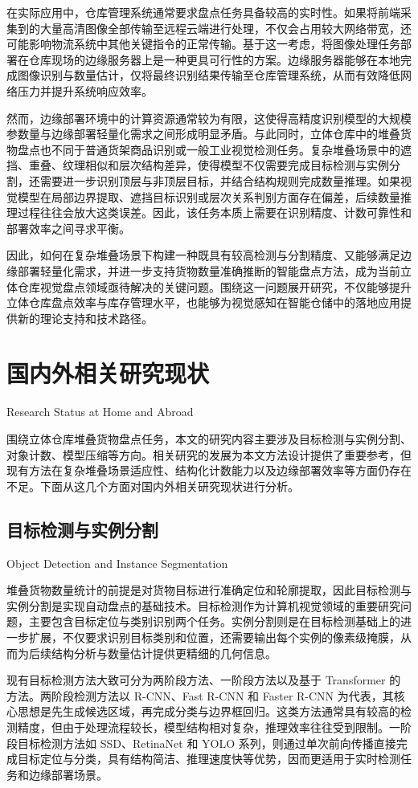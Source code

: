 在实际应用中，仓库管理系统通常要求盘点任务具备较高的实时性。如果将前端采集到的大量高清图像全部传输至远程云端进行处理，不仅会占用较大网络带宽，还可能影响物流系统中其他关键指令的正常传输。基于这一考虑，将图像处理任务部署在仓库现场的边缘服务器上是一种更具可行性的方案。边缘服务器能够在本地完成图像识别与数量估计，仅将最终识别结果传输至仓库管理系统，从而有效降低网络压力并提升系统响应效率。

然而，边缘部署环境中的计算资源通常较为有限，这使得高精度识别模型的大规模参数量与边缘部署轻量化需求之间形成明显矛盾。与此同时，立体仓库中的堆叠货物盘点也不同于普通货架商品识别或一般工业视觉检测任务。复杂堆叠场景中的遮挡、重叠、纹理相似和层次结构差异，使得模型不仅需要完成目标检测与实例分割，还需要进一步识别顶层与非顶层目标，并结合结构规则完成数量推理。如果视觉模型在局部边界提取、遮挡目标识别或层次关系判别方面存在偏差，后续数量推理过程往往会放大这类误差。因此，该任务本质上需要在识别精度、计数可靠性和部署效率之间寻求平衡。

因此，如何在复杂堆叠场景下构建一种既具有较高检测与分割精度、又能够满足边缘部署轻量化需求，并进一步支持货物数量准确推断的智能盘点方法，成为当前立体仓库视觉盘点领域亟待解决的关键问题。围绕这一问题展开研究，不仅能够提升立体仓库盘点效率与库存管理水平，也能够为视觉感知在智能仓储中的落地应用提供新的理论支持和技术路径。

\section{国内外相关研究现状}{Research Status at Home and Abroad}

围绕立体仓库堆叠货物盘点任务，本文的研究内容主要涉及目标检测与实例分割、对象计数、模型压缩等方向。相关研究的发展为本文方法设计提供了重要参考，但现有方法在复杂堆叠场景适应性、结构化计数能力以及边缘部署效率等方面仍存在不足。下面从这几个方面对国内外相关研究现状进行分析。

\subsection{目标检测与实例分割}{Object Detection and Instance Segmentation}

堆叠货物数量统计的前提是对货物目标进行准确定位和轮廓提取，因此目标检测与实例分割是实现自动盘点的基础技术。目标检测作为计算机视觉领域的重要研究问题，主要包含目标定位与类别识别两个任务。实例分割则是在目标检测基础上的进一步扩展，不仅要求识别目标类别和位置，还需要输出每个实例的像素级掩膜，从而为后续结构分析与数量估计提供更精细的几何信息。

现有目标检测方法大致可分为两阶段方法、一阶段方法以及基于 Transformer 的方法。两阶段检测方法以 R-CNN、Fast R-CNN 和 Faster R-CNN 为代表，其核心思想是先生成候选区域，再完成分类与边界框回归。这类方法通常具有较高的检测精度，但由于处理流程较长，模型结构相对复杂，推理效率往往受到限制。一阶段目标检测方法如 SSD、RetinaNet 和 YOLO 系列，则通过单次前向传播直接完成目标定位与分类，具有结构简洁、推理速度快等优势，因而更适用于实时检测任务和边缘部署场景。

